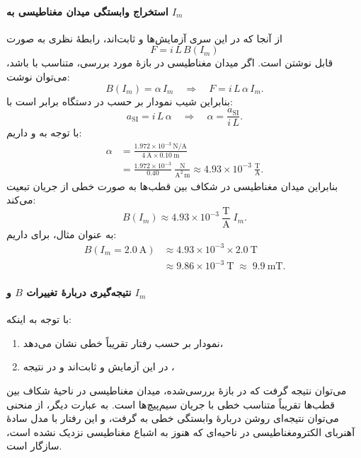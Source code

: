 \documentclass[a4paper, 11pt]{article}
\begin{document}
\paragraph{استخراج وابستگی میدان مغناطیسی به \texorpdfstring{$I_m$}{Im}}
از آنجا که در این سری آزمایش‌ها  و  ثابت‌اند، رابطهٔ نظری به صورت
\begin{equation}
F = i\,L\,B(I_m)
\end{equation}
قابل نوشتن است. اگر میدان مغناطیسی در بازهٔ مورد بررسی، متناسب با  باشد، می‌توان نوشت:
\begin{equation}
B(I_m) = \alpha\,I_m \quad\Rightarrow\quad F = i\,L\,\alpha\,I_m.
\end{equation}
بنابراین شیب نمودار  بر حسب  در دستگاه  برابر است با:
\begin{equation}
a_{\mathrm{SI}} = i\,L\,\alpha \quad\Rightarrow\quad \alpha = \frac{a_{\mathrm{SI}}}{i\,L}.
\end{equation}
با توجه به  و  داریم:
\begin{align}
\alpha &= \frac{1.972\times 10^{-3}~\mathrm{N/A}}{4~\mathrm{A}\times 0.10~\mathrm{m}} \nonumber\\
       &= \frac{1.972\times 10^{-3}}{0.40}~\frac{\mathrm{N}}{\mathrm{A}^2\,\mathrm{m}} 
        \approx 4.93\times 10^{-3}~\frac{\mathrm{T}}{\mathrm{A}}.
\end{align}
بنابراین میدان مغناطیسی در شکاف بین قطب‌ها به صورت خطی از جریان  تبعیت می‌کند:
\begin{equation}
B(I_m) \approx 4.93\times 10^{-3}~\frac{\mathrm{T}}{\mathrm{A}}\; I_m.
\end{equation}
به عنوان مثال، برای  داریم:
\begin{align}
B(I_m = 2.0~\mathrm{A}) &\approx 4.93\times 10^{-3}\times 2.0~\mathrm{T} \nonumber\\
&\approx 9.86\times 10^{-3}~\mathrm{T} 
\;\approx\; 9.9~\mathrm{mT}.
\end{align}

\paragraph{نتیجه‌گیری دربارهٔ تغییرات \texorpdfstring{$B$}{B} و \texorpdfstring{$I_m$}{Im}}
با توجه به اینکه:
\begin{enumerate}

\item نمودار  بر حسب  رفتار تقریباً خطی نشان می‌دهد،  
\item  در این آزمایش  و  ثابت‌اند و در نتیجه ،  
\end{enumerate}
می‌توان نتیجه گرفت که در بازهٔ بررسی‌شده، میدان مغناطیسی  در ناحیهٔ شکاف بین قطب‌ها تقریباً متناسب خطی با جریان سیم‌پیچ‌ها  است. به عبارت دیگر، از منحنی  می‌توان نتیجه‌ای روشن دربارهٔ وابستگی خطی  به  گرفت، و این رفتار با مدل سادهٔ آهنربای الکترومغناطیسی در ناحیه‌ای که هنوز به اشباع مغناطیسی نزدیک نشده است، سازگار است.
\end{document}
